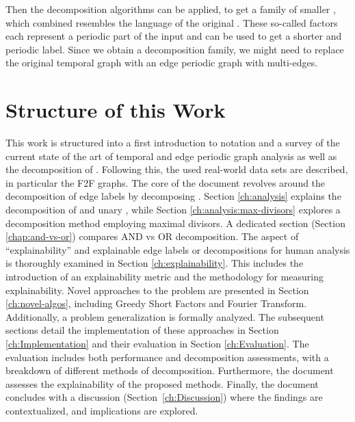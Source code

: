 Then the \DFA decomposition algorithms can be applied, to get a family of smaller \DFAs, which combined resembles the language of the original \DFA.
These so-called factors each represent a periodic part of the input and can be used to get a shorter and periodic label.
Since we obtain a decomposition family, we might need to replace the original temporal graph with an edge periodic graph with multi-edges. 

\section{Structure of this Work}
\label{ch:Intoduction:sec:Structure}
This work is structured into a first introduction to notation and a survey of the current state of the art of temporal and edge periodic graph analysis as well as the decomposition of \DFAs.
Following this, the used real-world data sets are described, in particular the F2F graphs.
The core of the document revolves around the decomposition of edge labels by decomposing \DFAs.
Section \ref{ch:analysis} explains the decomposition of \DFAs and unary \DFAs, while Section \ref{ch:analysis:max-divisors} explores a decomposition method employing maximal divisors.
A dedicated section (Section \ref{chap:and-vs-or}) compares AND vs OR decomposition.
The aspect of \enquote{explainability} and explainable edge labels or decompositions for human analysis is thoroughly examined in Section \ref{ch:explainability}.
This includes the introduction of an explainability metric and the methodology for measuring explainability.
Novel approaches to the problem are presented in Section \ref{ch:novel-algos}, including Greedy Short Factors and Fourier Transform.
Additionally, a problem generalization is formally analyzed.
The subsequent sections detail the implementation of these approaches in Section \ref{ch:Implementation} and their evaluation in Section \ref{ch:Evaluation}.
The evaluation includes both performance and decomposition assessments, with a breakdown of different methods of decomposition.
Furthermore, the document assesses the explainability of the proposed methods.
Finally, the document concludes with a discussion (Section~\ref{ch:Discussion}) where the findings are contextualized, and implications are explored.






